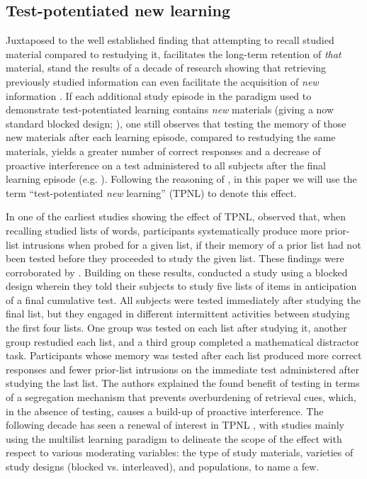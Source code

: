 \documentclass[../main.tex]{subfiles}
\begin{document}
\hypertarget{tpnl}{%
\subsection{Test-potentiated new learning}}

Juxtaposed to the well established finding that attempting to recall studied material compared to restudying it, facilitates the long-term retention of \textit{that} material, stand the results of a decade of research showing that retrieving previously studied information can even facilitate the acquisition of \textit{new} information \citep{chanRetrievalPotentiatesNew2018, yangEnhancingLearningRetrieval2018}. If each additional study episode in the paradigm used to demonstrate test-potentiated learning contains \textit{new} materials (giving a now standard blocked design; \cite{chanTestingPotentiatesNew2018}), one still observes that testing the memory of those new materials after each learning episode, compared to restudying the same materials, yields a greater number of correct responses and a decrease of proactive interference on a test administered to all subjects after the final learning episode (e.g. \citealp{szpunarInterpolatedMemoryTests2013, szpunarTestingStudyInsulates2008, wissmanInterimTestEffect2011}). Following the reasoning of \cite{chanRetrievalPotentiatesNew2018}, in this paper we will use the term ``test-potentiated \textit{new} learning'' (TPNL) to denote this effect.

In one of the earliest studies showing the effect of TPNL, \cite{darleyEffectsPriorFree1971} observed that, when recalling studied lists of words, participants systematically produce more prior-list intrusions when probed for a given list, if their memory of a prior list had not been tested before they proceeded to study the given list. These findings were corroborated by \cite{tulvingNegativeTransferEffects1974}. Building on these results, \cite{szpunarTestingStudyInsulates2008} conducted a study using a blocked design wherein they told their subjects to study five lists of items in anticipation of a final cumulative test. All subjects were tested immediately after studying the final list, but they engaged in different intermittent activities between studying the first four lists. One group was tested on each list after studying it, another group restudied each list, and a third group completed a mathematical distractor task. Participants whose memory was tested after each list produced more correct responses and fewer prior-list intrusions on the immediate test administered after studying the last list. The authors explained the found benefit of testing in terms of a segregation mechanism that prevents overburdening of retrieval cues, which, in the absence of testing, causes a build-up of proactive interference. The following decade has seen a renewal of interest in TPNL \citep{chanRetrievalPotentiatesNew2018, pastotterRetrievalPracticeEnhances2014, yangEnhancingLearningRetrieval2018}, with studies mainly using the multilist learning paradigm to delineate the scope of the effect with respect to various moderating variables: the type of study materials, varieties of study designs (blocked vs. interleaved), and populations, to name a few. 
\end{document}
